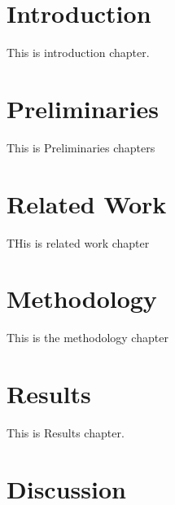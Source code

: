 \documentclass[12pt]{report}
\begin{document}
%
%
%
\newpage
\setcounter{page}{1}
\setlength{\parindent}{2em}



\chapter[Introduction]{Introduction}
\label{chap:introduction}
%
This is introduction chapter.

\chapter[Preliminaries]{Preliminaries}
\label{preliminaries}
This is Preliminaries chapters

\chapter[Related Work]{Related Work}
\label{relatedwork}
THis is related work chapter

\chapter[Methodology]{Methodology}
\label{chap:methodology}
This is the methodology chapter

\chapter[Results]{Results}
\label{chap:results}
This is Results chapter.

\chapter[Discussion]{Discussion}
\label{chap:discussion}
\end{document}
